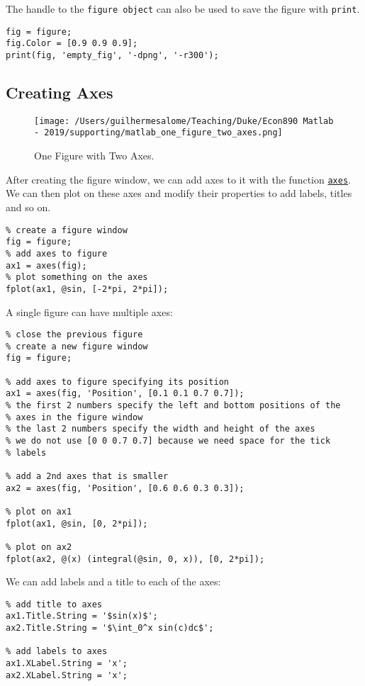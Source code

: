 \documentclass[12pt, a4paper]{article}
\begin{document}
The handle to the \texttt{figure object} can also be used to save the figure with \texttt{print}.
\lstset{language=matlab,label= ,caption= ,captionpos=b,firstnumber=1,numbers=left,style=Matlab-editor}
\begin{lstlisting}
fig = figure;
fig.Color = [0.9 0.9 0.9];
print(fig, 'empty_fig', '-dpng', '-r300');
\end{lstlisting}
\subsection{Creating Axes}
\label{sec:org1cfe0bb}
\begin{figure}[H]
\centering
\texttt{[image: /Users/guilhermesalome/Teaching/Duke/Econ890 Matlab - 2019/supporting/matlab\_one\_figure\_two\_axes.png]}
\caption{\label{fig:org1fd167f}
One Figure with Two Axes.}
\end{figure}

After creating the figure window, we can add axes to it with the function \href{https://www.mathworks.com/help/matlab/ref/axes.html?s\_tid=doc\_ta}{\texttt{axes}}.
We can then plot on these axes and modify their properties to add labels, titles and so on.
\lstset{language=matlab,label= ,caption= ,captionpos=b,firstnumber=1,numbers=left,style=Matlab-editor}
\begin{lstlisting}
% create a figure window
fig = figure;
% add axes to figure
ax1 = axes(fig);
% plot something on the axes
fplot(ax1, @sin, [-2*pi, 2*pi]);
\end{lstlisting}
A single figure can have multiple axes:
\lstset{language=matlab,label= ,caption= ,captionpos=b,firstnumber=1,numbers=left,style=Matlab-editor}
\begin{lstlisting}
% close the previous figure
% create a new figure window
fig = figure;

% add axes to figure specifying its position
ax1 = axes(fig, 'Position', [0.1 0.1 0.7 0.7]);
% the first 2 numbers specify the left and bottom positions of the
% axes in the figure window
% the last 2 numbers specify the width and height of the axes
% we do not use [0 0 0.7 0.7] because we need space for the tick
% labels

% add a 2nd axes that is smaller
ax2 = axes(fig, 'Position', [0.6 0.6 0.3 0.3]);

% plot on ax1
fplot(ax1, @sin, [0, 2*pi]);

% plot on ax2
fplot(ax2, @(x) (integral(@sin, 0, x)), [0, 2*pi]);
\end{lstlisting}
We can add labels and a title to each of the axes:
\lstset{language=matlab,label= ,caption= ,captionpos=b,firstnumber=1,numbers=left,style=Matlab-editor}
\begin{lstlisting}
% add title to axes
ax1.Title.String = '$sin(x)$';
ax2.Title.String = '$\int_0^x sin(c)dc$';

% add labels to axes
ax1.XLabel.String = 'x';
ax2.XLabel.String = 'x';
\end{lstlisting}
\end{document}
